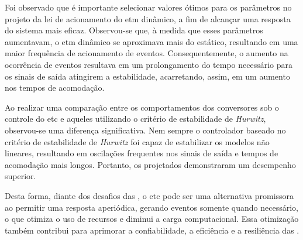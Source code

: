 Foi observado que é importante selecionar valores ótimos para os parâmetros no projeto da lei de acionamento do \acrshort{etm} dinâmico, a fim de alcançar uma resposta do sistema mais eficaz. Observou-se que, à medida que esses parâmetros aumentavam, o \acrshort{etm} dinâmico se aproximava mais do estático, resultando em uma maior frequência de acionamento de eventos. Consequentemente, o aumento na ocorrência de eventos resultava em um prolongamento do tempo necessário para os sinais de saída atingirem a estabilidade, acarretando, assim, em um aumento nos tempos de acomodação.

Ao realizar uma comparação entre os comportamentos dos conversores sob o controle do \acrshort{etc} e aqueles utilizando o critério de estabilidade de \textit{Hurwitz}, observou-se uma diferença significativa. Nem sempre o controlador baseado no critério de estabilidade de \textit{Hurwitz} foi capaz de estabilizar os modelos não lineares, resultando em oscilações frequentes nos sinais de saída e tempos de acomodação mais longos. Portanto, os  projetados demonstraram um desempenho superior.

Desta forma, diante dos desafios das , o \acrshort{etc} pode ser uma alternativa promissora ao permitir uma resposta aperiódica, gerando eventos somente quando necessário, o que otimiza o uso de recursos e diminui a carga computacional. Essa otimização também contribui para aprimorar a confiabilidade, a eficiência e a resiliência das .